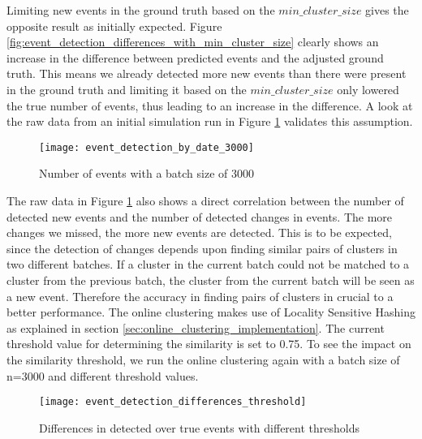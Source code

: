 Limiting new events in the ground truth based on the $min\_cluster\_size$ gives the opposite result as initially expected. 
Figure \ref{fig:event_detection_differences_with_min_cluster_size} clearly shows an increase in the difference between predicted events and the adjusted ground truth. This means we already detected more new events than there were present in the ground truth and limiting it based on the $min\_cluster\_size$ only lowered the true number of events, thus leading to an increase in the difference. A look at the raw data from an initial simulation run in Figure \ref{fig:event_detection_by_date_3000} validates this assumption.

\begin{figure}[h]
    \centering
    \texttt{[image: event\_detection\_by\_date\_3000]}
    \caption{Number of events with a batch size of 3000}
    \label{fig:event_detection_by_date_3000}
\end{figure}

The raw data in Figure \ref{fig:event_detection_by_date_3000} also shows a direct correlation between the number of detected new events and the number of detected changes in events. The more changes we missed, the more new events are detected. This is to be expected, since the detection of changes depends upon finding similar pairs of clusters in two different batches. If a cluster in the current batch could not be matched to a cluster from the previous batch, the cluster from the current batch will be seen as a new event. Therefore the accuracy in finding pairs of clusters in crucial to a better performance. The online clustering makes use of Locality Sensitive Hashing as explained in section \ref{sec:online_clustering_implementation}. The current threshold value for determining the similarity is set to 0.75. To see the impact on the similarity threshold, we run the online clustering again with a batch size of n=3000 and different threshold values.

\begin{figure}[h]
    \centering
    \texttt{[image: event\_detection\_differences\_threshold]}
    \caption{Differences in detected over true events with different thresholds}
    \label{fig:event_detection_differences_threshold}
\end{figure}

